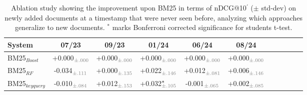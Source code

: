 \begin{table}[t]
\small
\centering
\renewcommand{\tabcolsep}{2.8pt}
\caption{Ablation study showing the improvement upon BM25 in terms of nDCG@10$^{'}$ ($\pm$ std-dev) on newly added documents at a timestamp that were never seen before, analyzing which approaches generalize to new documents. $^{*}$ marks Bonferroni corrected significance for students t-test.}
\label{tab:table-results-fold}

\begin{tabular}{@{}lcccccccccc@{}}
    \toprule
    \bfseries System & \bfseries 07/23 & \bfseries 09/23 & \bfseries 01/24 & \bfseries 06/24 & \bfseries 08/24 \\
    
    \midrule

    
BM25$_{Boost}$ & +0.000$^{\phantom{*}}_{\color{gray}\pm.000}$ & +0.000$^{\phantom{*}}_{\color{gray}\pm.000}$ & +0.000$^{\phantom{*}}_{\color{gray}\pm.000}$ & +0.000$^{\phantom{*}}_{\color{gray}\pm.000}$ & +0.000$^{\phantom{*}}_{\color{gray}\pm.000}$ \\
    BM25$_{RF}$ & -0.034$^{\phantom{*}}_{\color{gray}\pm.111}$ & +0.000$^{\phantom{*}}_{\color{gray}\pm.135}$ & +0.022$^{\phantom{*}}_{\color{gray}\pm.146}$ & +0.012$^{\phantom{*}}_{\color{gray}\pm.081}$ & +0.006$^{\phantom{*}}_{\color{gray}\pm.146}$ \\
    BM25$_{keyquery}$ & -0.010$^{\phantom{*}}_{\color{gray}\pm.084}$ & +0.012$^{\phantom{*}}_{\color{gray}\pm.153}$ & +0.032$^{*}_{\color{gray}\pm.105}$ & -0.001$^{\phantom{*}}_{\color{gray}\pm.065}$ & +0.002$^{\phantom{*}}_{\color{gray}\pm.085}$ \\




\bottomrule
\end{tabular}
\end{table}
